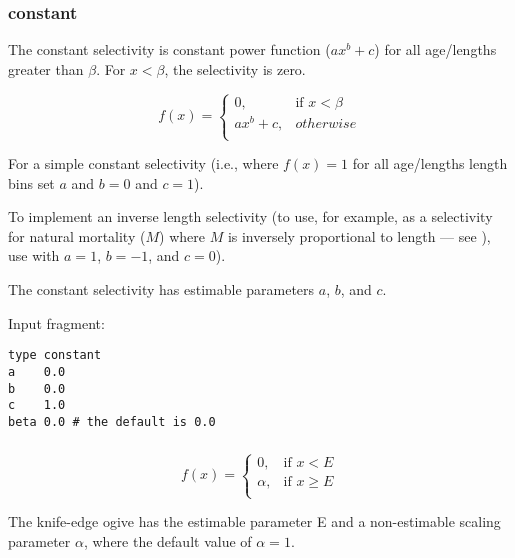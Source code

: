 \subsubsection[Constant]{{constant}}\label{sec:Selectivity-Constant}

The constant selectivity is constant power function ($ax^b+c$) for all age/lengths greater than $\beta$. For $x < \beta$, the selectivity is zero.

\begin{equation}
f(x)= \begin{cases}
	0, & \text{if $x < \beta$} \\
	ax^b + c, & otherwise \\
\end{cases}
\end{equation}

For a simple constant selectivity (i.e., where $f(x) = 1$ for all \ifAgeBased age/lengths \else length bins \fi set $a$ and $b = 0$ and $c = 1$). 

To implement an inverse length selectivity (to use, for example, as a selectivity for natural mortality ($M$) where $M$ is inversely proportional to length --- see \cite{lorenzen_natural_2022}), use \ifAgeBased {} with \fi $a=1$, $b=-1$, and $c=0$).

The constant selectivity has estimable parameters $a$, $b$, and $c$.

Input fragment: {\small{\begin{verbatim}
type constant
a    0.0
b    0.0
c    1.0
beta 0.0 # the default is 0.0
\end{verbatim}}}

\subsubsection[Knife-edge]{}\label{sec:Selectivity-KnifeEdge} 

\begin{equation}
f(x)= \begin{cases}
  0, & \text{if $x < E$} \\
  \alpha, & \text{if $x \ge E$}\\
  \end{cases}
\end{equation}

The knife-edge ogive has the estimable parameter E and a non-estimable scaling parameter $\alpha$, where the default value of $\alpha = 1$.

